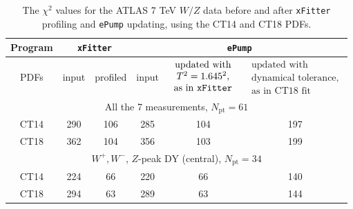  
 \begin{table}
\centering
\caption{The $\chi^2$ values for the ATLAS 7 TeV $W/Z$ data before and after \texttt{xFitter} profiling and \texttt{ePump} updating, using the CT14 and CT18 PDFs. 
}
\label{tab:chi2}
\begin{tabular}{c||c|c||c|c|c}
\hline\hline
Program & \multicolumn{2}{c||}{\texttt{xFitter}} & \multicolumn{3}{c}{\texttt{ePump}} \\
\hline
 PDFs & input & profiled & input & 
 $\begin{array}{c}
 \mbox{updated with}\\
 T^2=1.645^2,\\ 
 \mbox{as in \texttt{xFitter}}
 \end{array}
 $& 
 $\begin{array}{c}
 \mbox{updated with}\\
 \mbox{dynamical tolerance,}\\ 
 \mbox{as in CT18 fit}
 \end{array}
 $
 \\
\hline
\multicolumn{6}{c}{All the 7 measurements, $N_{\textrm{pt}}=61$}\\
\hline
CT14     & 290 & 106  & 285  & 104  &197  \\
CT18     & 362 & 104  & 356  & 103 &  199   \\
\hline
\multicolumn{6}{c}{$W^{+},W^{-}$, $Z$-peak DY (central), $N_{\textrm{pt}}=34$}\\
\hline
CT14     & 224 & 66  & 220  &  66  & 140\\
CT18     & 294 & 63 & 289  &  63 &  144\\
\hline
\hline
\end{tabular}
\end{table}

